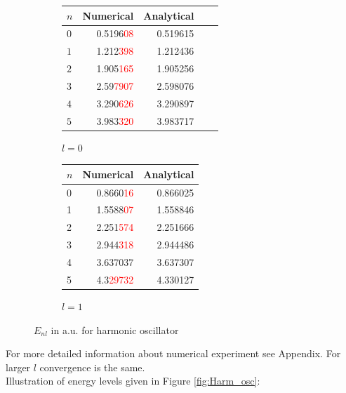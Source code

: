 \documentclass[a4paper, 12pt]{article}
\begin{document}
\begin{figure}[h!]
\centering
\begin{subfigure}{.45\textwidth}
\begin{tabular}{lrrrr}
\toprule
{$n$} &     {Numerical} &     {Analytical}   \\
\midrule
$ 0 $&   0.5196\textcolor{red}{08} &    0.519615 \\
$ 1 $ &   1.212\textcolor{red}{398} &    1.212436 \\
$ 2$ &   1.905\textcolor{red}{165} &    1.905256 \\
$ 3 $ &   2.59\textcolor{red}{7907} &    2.598076 \\
$ 4$ &   3.290\textcolor{red}{626} &    3.290897 \\
$ 5 $ &   3.983\textcolor{red}{320} &    3.983717 \\
\bottomrule
\end{tabular}
\caption{$l=0$}
\end{subfigure}%
\begin{subfigure}{.45\textwidth}
\begin{tabular}{lrr}
\toprule
{$n$} &  Numerical &  Analytical \\
\midrule
0 &   0.8660\textcolor{red}{16} &    0.866025 \\
1 &   1.5588\textcolor{red}{07} &    1.558846 \\
2 &   2.251\textcolor{red}{574} &    2.251666 \\
3 &   2.944\textcolor{red}{318} &    2.944486 \\
4 &   3.637037 &    3.637307 \\
5 &   4.3\textcolor{red}{29732} &    4.330127 \\
\bottomrule
\end{tabular}
\caption{$l=1$}
\end{subfigure}
\caption{$E_{nl}$ in a.u. for harmonic oscillator }
\end{figure}
For more detailed information about numerical experiment see Appendix. For larger $l$ convergence is the same. \\
Illustration of energy levels given in  Figure \ref{fig:Harm_osc}:
\end{document}
